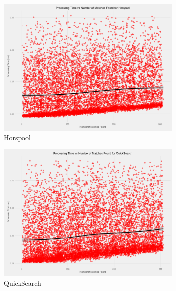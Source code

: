 \documentclass[11pt]{article}
\begin{document}
\begin{figure}[!htb]
  \centering
  \begin{subfigure}[b]{0.48\textwidth}
      \includegraphics[width=\textwidth]{images/processing_speed_vs_num_matches_Horspool}
      \caption{Horspool}
  \end{subfigure}
  \begin{subfigure}[b]{0.48\textwidth}
      \includegraphics[width=\textwidth]{images/processing_speed_vs_num_matches_QuickSearch}
      \caption{QuickSearch}
  \end{subfigure}
  ~
  \begin{subfigure}[b]{0.48\textwidth}

\end{subfigure}
\end{figure}
\end{document}
